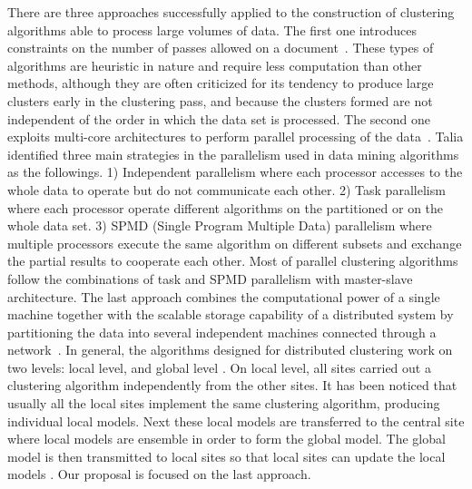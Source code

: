\documentclass[smallextended]{svjour3}       %
\begin{document}
There are three approaches successfully applied to the construction of clustering algorithms able to process large volumes of data. The first one introduces constraints on the number of passes allowed on a document~\cite{Yi14}. These types of algorithms are heuristic in nature and require less computation than other methods, although they are often criticized for its tendency to produce large clusters early in the clustering pass, and because the clusters formed are not independent of the order in which the data set is processed. The second one exploits multi-core architectures to perform parallel processing of the data~\cite{ZW13}. Talia \cite{Tal02} identified three main strategies in the parallelism used in data mining algorithms as the followings. 1) Independent parallelism where each processor accesses to the whole data to operate but do not communicate each other. 2) Task parallelism where each processor operate different algorithms on the partitioned or on the whole data set. 3) SPMD (Single Program Multiple Data) parallelism where multiple processors execute the same algorithm on different subsets and exchange the partial results to cooperate each other. Most of parallel clustering algorithms follow the combinations of task and SPMD parallelism with master-slave architecture. The last approach combines the computational power of a single machine together with the scalable storage capability of a distributed system by partitioning the data into several independent machines connected through a network~\cite{SC16}. In  general,  the  algorithms  designed  for  distributed  
clustering  work  on  two levels:  local level, and global level \cite{KLM03,Vis08,XJK99}. On local level, all sites  carried  out  a  clustering  algorithm  independently from the other sites. It has been noticed that usually all the local sites implement the same clustering algorithm, producing individual local models. Next these local models are transferred to the central site where local models are ensemble in order to form the global model. The global model is then transmitted to local sites so that local sites can update the local models \cite{XJK99}. Our proposal is focused on the last approach. 
\end{document}
